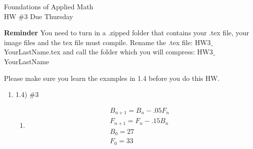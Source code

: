 \documentclass[12pt,letterpaper]{article}
\begin{document}
Foundations of Applied Math\\
 HW \#3
 Due Thursday 

\textbf{Reminder} You need to turn in a .zipped folder that contains your .tex file, your image files and the tex file must compile.
Rename the .tex file: HW3$\_$YourLastName.tex and call the folder which you will compress: HW3$\_$YourLastName

Please make sure you learn the examples in 1.4 before you do this HW.

\begin{enumerate}

\item 1.4) \#3
  \begin{enumerate}
    \item 
    \begin{eqnarray*}
      B_{n+1} = B_{n} - .05F_{n}\\
      F_{n+1} = F_{n} - .15B_{n}\\
      B_{0} = 27\\
      F_{0} = 33
    \end{eqnarray*}


\end{enumerate}
\end{enumerate}
\end{document}
